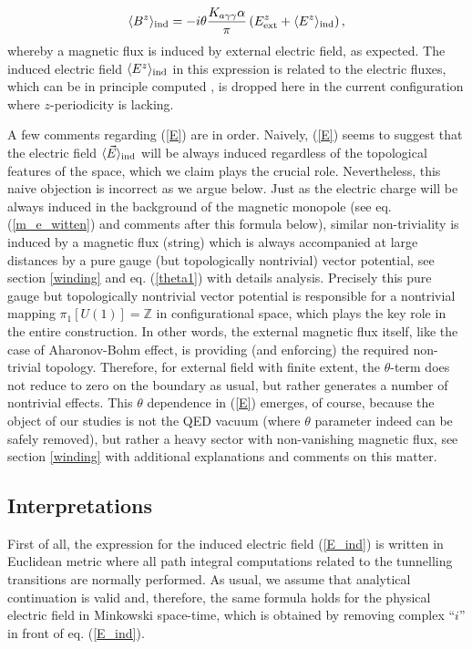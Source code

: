 \documentclass[ twocolumn,aps,prd,   
               preprintnumbers,numbers,sort&compress,nofootinbib,
                            showpacs,superscriptaddress,
               colorlinks,
               linkcolor=blue,   
               citecolor=blue]{revtex4-1}   \newcommand{\exclude}[1]{}
\newcommand{\be}{\begin{eqnarray}}
\newcommand{\ee}{\end{eqnarray}}
\def\la{\langle}
\def\ra{\rangle}
\begin{document}
\be
\label{dual_indfield}
\langle B^z\rangle_{\rm ind} = -i\theta\frac{K_{a\gamma\gamma}\alpha}{\pi} \left(E_{\rm ext}^z +\la E^z\ra_{\rm ind}\right),
\ee
whereby a magnetic flux is induced by external electric field, as expected. The induced electric field $\la E^z\ra_{\rm ind}$ in this expression is related to the electric fluxes, which can be in principle computed \cite{Cao:2015uza}, is dropped here in the current configuration where $z$-periodicity is lacking.

A few comments regarding (\ref{E}) are in order. Naively, (\ref{E}) seems to suggest that the electric  field $\la \vec{E}\ra_{\rm ind}$ will be always induced regardless of the topological features of the space, which we claim plays the crucial role. Nevertheless, this  naive objection   is incorrect as we argue below.
Just as the electric charge  will be always induced in the background of the   magnetic monopole  (see eq. (\ref{m_e_witten}) and comments after this formula below), similar non-triviality is induced by a magnetic flux (string) which is always accompanied at large distances by a pure gauge    (but topologically nontrivial) vector potential, see section \ref{winding} and eq. (\ref{theta1}) with  details analysis. Precisely this pure gauge but topologically nontrivial vector potential is responsible for  a nontrivial mapping 
$\pi_1[U(1)]=\mathbb{Z}$ in configurational space, which plays the key role in the entire construction.  In other words, the external magnetic flux itself, like the case of Aharonov-Bohm effect, is providing (and enforcing) the required non-trivial topology. Therefore, for external field with finite extent, the $\theta$-term does not reduce to zero on the boundary as usual, but rather generates a number of  nontrivial effects. This $\theta$ dependence in (\ref{E})  emerges, of course,  because the object of our studies is not the QED vacuum (where $\theta$ parameter indeed can be safely removed), but rather a heavy sector with non-vanishing magnetic flux, see   section \ref{winding}  with  additional explanations and comments on this matter. 

 \subsection{Interpretations}\label{interpretation} 
 First of all, the expression for the induced electric field (\ref{E_ind}) is written in Euclidean metric where all path integral computations 
 related to the tunnelling transitions are normally performed. As usual, we assume that analytical continuation is valid and, therefore, the same formula holds  for the physical electric field in Minkowski space-time, which is obtained by  removing complex ``$i$'' in front of eq. (\ref{E_ind}).   
 
\end{document}
